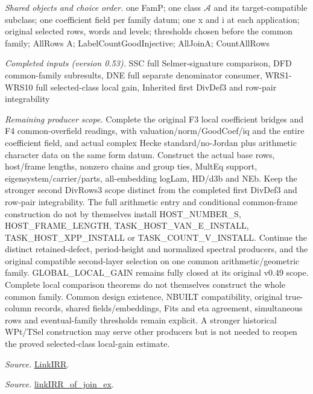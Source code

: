 \emph{Shared objects and choice order.} one FamP; one class $\mathcal A$ and its target-compatible subclass; one coefficient field per family datum; one x and i at each application; original selected rows, words and levels; thresholds chosen before the common family; AllRows A; LabelCountGoodInjective; AllJoinA; CountAllRows

\emph{Completed inputs (version 0.53).} SSC full Selmer-signature comparison, DFD common-family subresults, DNE full separate denominator consumer, WRS1-WRS10 full selected-class local gain, Inherited first DivDef3 and row-pair integrability

\emph{Remaining producer scope.} Complete the original F3 local coefficient bridges and F4 common-overfield readings, with valuation/norm/GoodCoef/iq and the entire coefficient field, and actual complex Hecke standard/no-Jordan plus arithmetic character data on the same form datum. Construct the actual base rows, host/frame lengths, nonzero chains and group ties, MultEq support, eigensystem/carrier/parts, all-embedding logLam, HD/d3b and NEb. Keep the stronger second DivRows3 scope distinct from the completed first DivDef3 and row-pair integrability. The full arithmetic entry and conditional common-frame construction do not by themselves install HOST\_\allowbreak NUMBER\_\allowbreak S, HOST\_\allowbreak FRAME\_\allowbreak LENGTH, TASK\_\allowbreak HOST\_\allowbreak VAN\_\allowbreak E\_\allowbreak INSTALL, TASK\_\allowbreak HOST\_\allowbreak XPP\_\allowbreak INSTALL or TASK\_\allowbreak COUNT\_\allowbreak V\_\allowbreak INSTALL. Continue the distinct retained-defect, period-height and normalized spectral producers, and the original compatible second-layer selection on one common arithmetic/geometric family. GLOBAL\_\allowbreak LOCAL\_\allowbreak GAIN remains fully closed at its original v0.49 scope. Complete local comparison theorems do not themselves construct the whole common family. Common design existence, NBUILT compatibility, original true-column records, shared fields/embeddings, Fits and eta agreement, simultaneous rows and eventual-family thresholds remain explicit. A stronger historical WPt/TSel construction may serve other producers but is not needed to reopen the proved selected-class local-gain estimate.

\emph{Source.} \href{https://github.com/CocoSgt/riemann-hypothesis-lean/blob/7cbf7a0c32fca1badf05931879a37c3f8a2b03b4/src/Formalism/SharpRestriction/GlobalTheoremInputs.lean#L55-L58}{LinkIRR}.

\emph{Source.} \href{https://github.com/CocoSgt/riemann-hypothesis-lean/blob/7cbf7a0c32fca1badf05931879a37c3f8a2b03b4/src/Development/AbelianVarietyTheory/Proofs/GlobalInterpolation/LinkIRROfJoinEx.lean#L17-L38}{linkIRR\_\allowbreak of\_\allowbreak join\_\allowbreak ex}.

